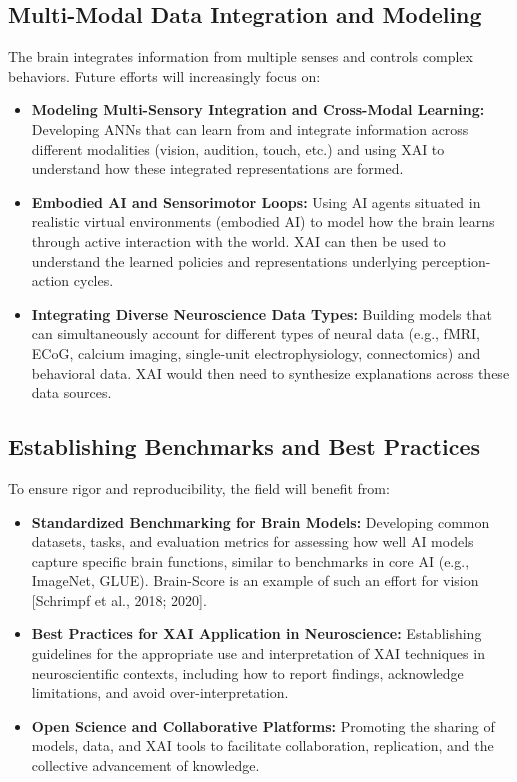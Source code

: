\documentclass[11pt,a4paper]{article}
\begin{document}
\subsection{Multi-Modal Data Integration and Modeling}
The brain integrates information from multiple senses and controls complex behaviors. Future efforts will increasingly focus on:
\begin{itemize}
    \item \textbf{Modeling Multi-Sensory Integration and Cross-Modal Learning:} Developing ANNs that can learn from and integrate information across different modalities (vision, audition, touch, etc.) and using XAI to understand how these integrated representations are formed.
    \item \textbf{Embodied AI and Sensorimotor Loops:} Using AI agents situated in realistic virtual environments (embodied AI) to model how the brain learns through active interaction with the world. XAI can then be used to understand the learned policies and representations underlying perception-action cycles.
    \item \textbf{Integrating Diverse Neuroscience Data Types:} Building models that can simultaneously account for different types of neural data (e.g., fMRI, ECoG, calcium imaging, single-unit electrophysiology, connectomics) and behavioral data. XAI would then need to synthesize explanations across these data sources.
\end{itemize}

\subsection{Establishing Benchmarks and Best Practices}
To ensure rigor and reproducibility, the field will benefit from:
\begin{itemize}
    \item \textbf{Standardized Benchmarking for Brain Models:} Developing common datasets, tasks, and evaluation metrics for assessing how well AI models capture specific brain functions, similar to benchmarks in core AI (e.g., ImageNet, GLUE). Brain-Score is an example of such an effort for vision [Schrimpf et al., 2018; 2020].
    \item \textbf{Best Practices for XAI Application in Neuroscience:} Establishing guidelines for the appropriate use and interpretation of XAI techniques in neuroscientific contexts, including how to report findings, acknowledge limitations, and avoid over-interpretation.
    \item \textbf{Open Science and Collaborative Platforms:} Promoting the sharing of models, data, and XAI tools to facilitate collaboration, replication, and the collective advancement of knowledge.
\end{itemize}
\end{document}
